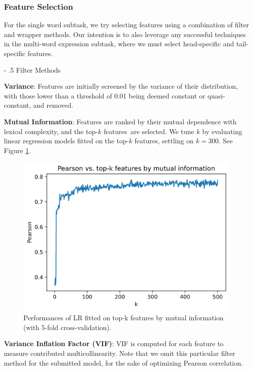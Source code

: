 \documentclass[11pt,a4paper]{article}
\makeatletter
\renewcommand\paragraph{%
    \@startsection{paragraph}{4}{0mm}%
        {-\baselineskip}%
        {.5\baselineskip}%
        {\normalfont\normalsize\bfseries}}
\makeatother
\begin{document}
\subsubsection{Feature Selection}

For the single word subtask, we try selecting features using a combination of filter and wrapper methods. Our intention is to also leverage any successful techniques in the multi-word expression subtask, where we must select head-specific and tail-specific features.

\paragraph{Filter Methods}

\textbf{Variance}: Features are initially screened by the variance of their distribution, with those lower than a threshold of 0.01 being deemed constant or quasi-constant, and removed. 

\textbf{Mutual Information}: Features are ranked by their mutual dependence with lexical complexity, and the top-$k$ features are selected. We tune $k$ by evaluating linear regression models fitted on the top-$k$ features, settling on $k=300$. See Figure \ref{fig:mi}.

\begin{figure}
  \centering
  \includegraphics[scale=0.4]{mi.png}
  \caption{\label{fig:mi} Performances of LR fitted on top-k features by mutual information (with 5-fold cross-validation).}
\end{figure}

\textbf{Variance Inflation Factor (VIF)}: VIF is computed for each feature to measure contributed multicollinearity. Note that we omit this particular filter method for the submitted model, for the sake of optimizing Pearson correlation.
\end{document}
